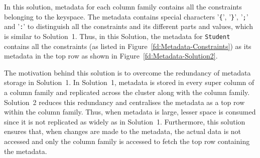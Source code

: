 In this solution, metadata  for each column family contains all the constraints
belonging to the keyspace. The metadata contains special characters
'\texttt{\{}',  '\texttt{\}}', '\texttt{;}' and '\texttt{:}' to distinguish all
the constraints and its different parts and values, which is similar to
Solution~1. Thus, in this Solution, the metadata for \texttt{Student}  contains
all the constraints (as listed in Figure~\ref{fd:Metadata-Constraints}) as its
metadata in the top row as shown in Figure~\ref{fd:Metadata-Solution2}.


% 
	
The motivation behind this solution is to overcome the redundancy of metadata
storage in Solution~1.  In Solution~1,  metadata is stored in every super column
of a column family and replicated across the cluster along with the column
family.  Solution~2 reduces this redundancy and centralises the metadata as a top
row within the column family.  Thus,  when metadata is large, lesser space is
consumed since it is not replicated as widely as in Solution~1. 
Furthermore,  this solution  ensures that, when changes are made to the
metadata, the actual data is not accessed and only the
column family  is accessed to fetch the top row containing the metadata. 










